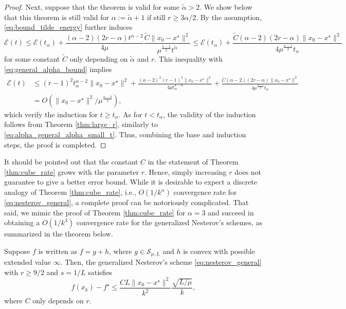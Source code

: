 \documentclass[twoside,11pt]{article}
\begin{document}
\begin{proof}
Next, suppose that the theorem is valid for some $\tilde{\alpha} > 2$. We show below that this theorem is still valid for $\alpha := \tilde{\alpha} + 1$ if still $r \geq 3\alpha/2$. By the assumption, \eqref{eq:bound_tilde_energy} further induces
\begin{equation}\nonumber
\mathcal{E}(t) \le \mathcal{E}(t_{\alpha}) +
\frac{(\alpha-2)(2r-\alpha)t^{\alpha-2}}{4\mu}\frac{\tilde{C}\|x_0 - x^\star\|^2}{\mu^{\frac{\tilde{\alpha}-2}{2}}t^{\tilde{\alpha}}} \le \mathcal{E}(t_{\alpha}) +
\frac{\tilde{C}(\alpha-2)(2r-\alpha)\|x_0 - x^\star\|^2}{4\mu^{\frac{\alpha-1}{2}}t_{\alpha}}
\end{equation}
for some constant $\tilde C$ only depending on $\tilde{\alpha}$ and $r$. This inequality with \eqref{eq:general_alpha_bound} implies
\begin{align*}\nonumber
\mathcal{E}(t)  &\le (r-1)^2t_{\alpha}^{\alpha-2}\|x_0-x^\star\|^2 + \frac{(\alpha-2)^2(r-1)^2\|x_0-x^\star\|^2}{4\mu t_{\alpha}^{4-\alpha}} + \frac{\tilde{C}(\alpha-2)(2r-\alpha)\|x_0 - x^\star\|^2}{4\mu^{\frac{\alpha-1}{2}}t_{\alpha}} \\
&= O\left( \|x_0-x^\star\|^2/\mu^{\frac{\alpha-2}{2}} \right),
\end{align*}
which verify the induction for $t \geq t_{\alpha}$. As for $t < t_{\alpha}$, the validity of the induction follows from Theorem \ref{thm:large_r}, similarly to \eqref{eq:alpha_general_alpha_small_t}. Thus, combining the base and induction steps, the proof is completed.
\end{proof}

It should be pointed out that the constant $C$ in the statement of Theorem \ref{thm:cube_rate} grows with the parameter $r$. Hence, simply increasing $r$ does not guarantee to give a better error bound. While it is desirable to expect a discrete analogy of Theorem \ref{thm:cube_rate}, i.e., $O(1/k^{\alpha})$ convergence rate for \eqref{eq:nesterov_general}, a complete proof can be notoriously complicated. That said, we mimic the proof of Theorem \ref{thm:cube_rate} for $\alpha = 3$ and succeed in obtaining a $O(1/k^3)$ convergence rate for the generalized Nesterov's schemes, as summarized in the theorem below.

\begin{theorem}\label{thm:dis_t3}
Suppose $f$ is written as $f = g + h$, where $g\in\mathcal{S}_{\mu,L}$ and $h$ is convex with possible extended value $\infty$. Then, the generalized Nesterov's scheme \eqref{eq:nesterov_general} with $r\geq 9/2$ and $s = 1/L$ satisfies
\begin{equation}\nonumber
f(x_k) - f^\star \le \frac{CL\|x_0-x^\star\|^2}{k^2}\frac{\sqrt{L/\mu}}{k},
\end{equation}
where $C$ only depends on $r$.
\end{theorem}
\end{document}
